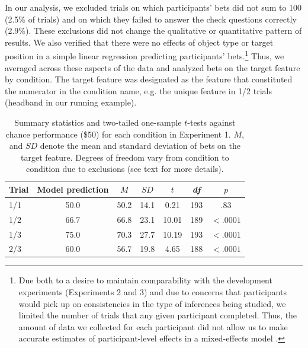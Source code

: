 \documentclass[man,noapacite]{apa2}
\begin{document}
In our analysis, we excluded trials on which participants' bets did not sum to 100 (2.5\% of trials) and on which they failed to answer the check questions correctly (2.9\%). These exclusions did not change the qualitative or quantitative pattern of results. We also verified that there were no effects of object type or target position in a simple linear regression predicting participants' bets.\footnote{Due both to a desire to maintain comparability with the development experiments (Experiments 2 and 3) and due to concerns that participants would pick up on consistencies in the type of inferences being studied, we limited the number of trials that any given participant completed. Thus, the amount of data we collected for each participant did not allow us to make accurate estimates of participant-level effects in a mixed-effects model \cite{gelman2006,jaeger2011}.}
Thus, we averaged across these aspects of the data and analyzed bets on the target feature by condition. The target feature was designated as the feature that constituted the numerator in the condition name, e.g. the unique feature in 1/2 trials ({\sc headband} in our running example).

\begin{table}
  \begin{center}
    \begin{tabular}{lcccccc}
      \hline
       Trial & Model prediction & $M$ & $SD$ & $t$ & {\it df} & $p$ \\
      \hline
      1/1 & 50.0 & 50.2 & 14.1 & 0.21 & 193 & .83 \\
      1/2 & 66.7 & 66.8 & 23.1 & 10.01 & 189 & $< .0001$ \\
      1/3 & 75.0 & 70.3 & 27.7 & 10.19 & 193 & $< .0001$ \\
      2/3 & 60.0 & 56.7 & 19.8 & 4.65 & 188 & $< .0001$ \\
      \hline
    \end{tabular}
    \caption{\label{tab:adults} Summary statistics and two-tailed one-sample $t$-tests against chance performance (\$50) for each condition in Experiment 1. $M$, and $SD$ denote the mean and standard deviation of bets on the target feature. Degrees of freedom vary from condition to condition due to exclusions (see text for more details).}
  \end{center}
\end{table}
\end{document}
